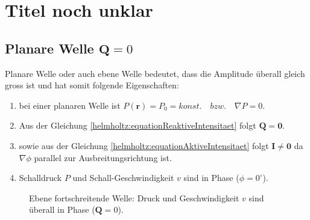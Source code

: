 %
%
%
%
\section{Titel noch unklar
\label{helmholtz:section:teil1}}


\subsection{Planare Welle $\mathbf{Q} = 0$
\label{helmholtz:subsection:planarWelle}}

Planare Welle oder auch ebene Welle bedeutet, dass die Amplitude überall gleich gross ist und hat somit folgende Eigenschaften:

\begin{enumerate}
\item bei einer planaren Welle ist $P (\mathbf{r}) = P_0 = konst.\quad bzw. \quad \nabla P = 0$.
\item Aus der Gleichung \eqref{helmholtz:equationReaktiveIntensitaet} folgt $\mathbf{Q} = \mathbf{0}$.
\item sowie aus der Gleichung \eqref{helmholtz:equationAktiveIntensitaet} folgt $\mathbf{I} \neq \mathbf{0}$ da $ \nabla \phi$ parallel zur Ausbreitungsrichtung ist.
\item Schalldruck $P$ und Schall-Geschwindigkeit $v$ sind in Phase ($\phi = 0^{\circ}$).
\end{enumerate}

\begin{figure}
\centering
{}
\caption{Ebene fortschreitende Welle: Druck und Geschwindigkeit $v$ sind überall in Phase ($\mathbf Q=0$).}
\end{figure}

